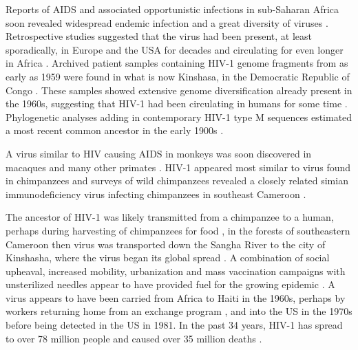 \documentclass[../sherrill-Mix_thesis.tex]{subfiles}
\begin{document}
	Reports of AIDS and associated opportunistic infections in sub-Saharan Africa soon revealed widespread endemic infection \citep{Clumeck1983,Clumeck1984,VandePerre1984,Piot1984} and a great diversity of viruses \citep{Nkengasong1994,Louwagie1995,Vidal2000,Rambaut2001,Yang2001,Kalish2004}. Retrospective studies suggested that the virus had been present, at least sporadically, in Europe and the USA for decades \citep{Froland1988,Garry1988} and circulating for even longer in Africa \citep{Bygbjerg1983,Vandepitte1983,Clumeck1984,Nahmias1986,Zhu1998,Worobey2008}. Archived patient samples containing HIV-1 genome fragments from as early as 1959 were found in what is now Kinshasa, in the Democratic Republic of Congo \citep{Nahmias1986}. These samples showed extensive genome diversification already present in the 1960s, suggesting that HIV-1 had been circulating in humans for some time \citep{Zhu1998,Worobey2008}. Phylogenetic analyses adding in contemporary HIV-1 type M sequences estimated a most recent common ancestor in the early 1900s \citep{Korber2000,Salemi2001,Sharp2001,Yusim2001,Worobey2008,Faria2014}.
	
	A virus similar to HIV causing AIDS in monkeys was soon discovered in macaques \citep{Daniel195,Peeters1989} and many other primates \citep{Peeters2001}. HIV-1 appeared most similar to virus found in chimpanzees \citep{Peeters1989,Huet1990} and surveys of wild chimpanzees revealed a closely related simian immunodeficiency virus infecting chimpanzees in southeast Cameroon \citep{Gao1999,Keele2006,VanHeuverswyn2007}.
	
	The ancestor of HIV-1 was likely transmitted from a chimpanzee to a human, perhaps during harvesting of chimpanzees for food \citep{Bowen-Jones1999,Hahn2000,Peeters2002,Wolfe2004,Wolfe2005,Kalish2005}, in the forests of southeastern Cameroon then virus was transported down the Sangha River \citep{Sharp2008} to the city of Kinshasha, where the virus began its global spread \citep{Vidal2000,Vangroenweghe2001,Worobey2008,Faria2014}. A combination of social upheaval, increased mobility, urbanization and mass vaccination campaigns with unsterilized needles appear to have provided fuel for the growing epidemic \citep{Chitnis2000,deSousa2010,deSousa2012,Faria2014}. A virus appears to have been carried from Africa to Haiti in the 1960s, perhaps by workers returning home from an exchange program \citep{Piot1984,Vangroenweghe2001}, and into the US in the 1970s \citep{Gilbert2007} before being detected in the US in 1981. In the past 34 years, HIV-1 has spread to over 78 million people and caused over 35 million deaths \citep{UNAIDSCGA2014}.
\end{document}
